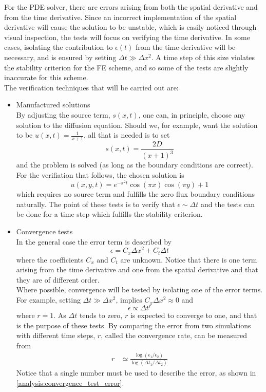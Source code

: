\noindent For the PDE solver, there are errors arising from both the spatial derivative and from the time derivative. 
Since an incorrect implementation of the spatial derivative will cause the solution to be unstable, which is easily noticed through visual inspection, the tests will focus on verifying the time derivative. 
In some cases, isolating the contribution to $\epsilon(t)$ from the time derivative will be necessary, and is ensured by setting $\Delta t \gg\Delta x^2$. 
A time step of this size violates the stability criterion for the FE scheme, and so some of the tests are slightly inaccurate for this scheme. \\

The verification techniques that will be carried out are:

\begin{itemize}
 \item Manufactured solutions\\
 By adjusting the source term, $s(x,t)$, one can, in principle, choose any solution to the diffusion equation. 
Should we, for example, want the solution to be $u(x,t) = \frac{1}{x+1}$, all that is needed is to set 
$$
s(x,t) = \frac{2D}{(x+1)^3}
$$
and the problem is solved (as long as the boundary conditions are correct).
 For the verifiation that follows, the chosen solution is
 \begin{equation}\label{manufactured_solution}
  u(x,y,t) = e^{-\pi^2t}\cos(\pi x)\cos(\pi y) +1
 \end{equation}
 which requires no source term and fulfills the zero flux boundary conditions naturally. 
  The point of these tests is to verify that $\epsilon \sim \Delta t$ and the tests can be done for a time step which fulfills the stability criterion.
  \item Convergence tests \\
  In the general case the error term is described by 
\begin{equation}\label{analysis:error}
 \epsilon = C_x\Delta x^2 + C_t\Delta t
\end{equation}
where the coefficients $C_x$ and $C_t$ are unknown. 
Notice that there is one term arising from the time derivative and one from the spatial derivative and that they are of different order. \\
Where possible, convergence will be tested by isolating one of the error terms. For example, setting $\Delta t \gg \Delta x^2$, implies $C_x\Delta x^2\approx0$ and 
$$
\epsilon \propto \Delta t^r
$$
where $r=1$. 
As $\Delta t$ tends to zero, $r$ is expected to converge to one, and that is the purpose of these tests. 
By comparing the error from two simulations with different time steps, $r$, called the convergence rate, can be measured from 
 \begin{align*}
   r&\simeq \frac{\log\left(\epsilon_1/\epsilon_2\right)}{\log\left(\Delta t_1/\Delta t_2\right)}
\end{align*}
Notice that a single number must be used to describe the error, as shown in \eqref{analysis:convergence_test_error}.


\end{itemize}

